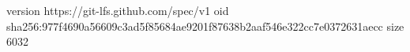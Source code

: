 version https://git-lfs.github.com/spec/v1
oid sha256:977f4690a56609c3ad5f85684ae9201f87638b2aaf546e322cc7e0372631aecc
size 6032
